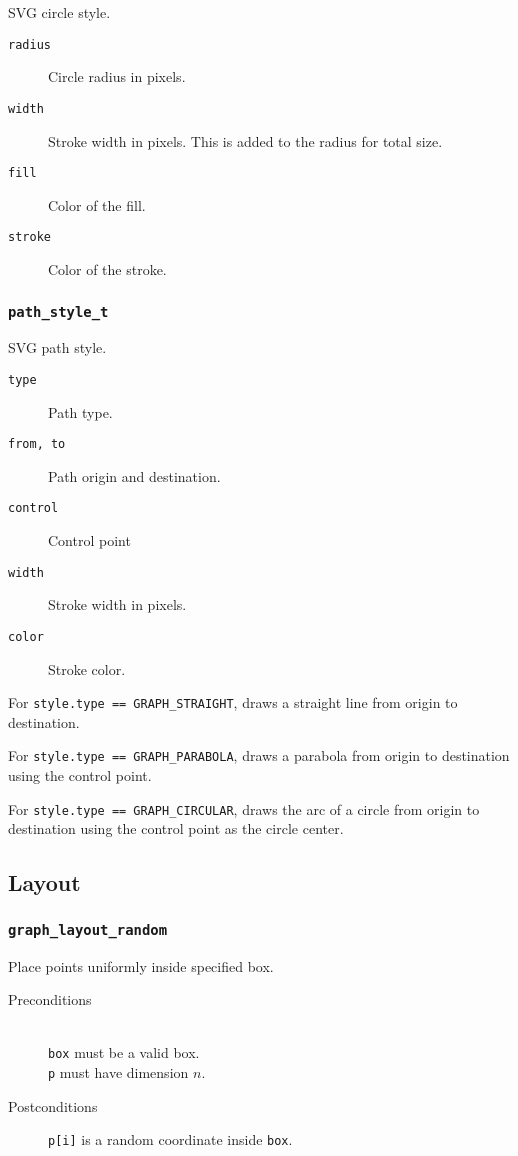 \documentclass[a4paper,10pt]{article}
\begin{document}
SVG circle style.

\begin{description}
 \item[\texttt{radius}] Circle radius in pixels.
 \item[\texttt{width}] Stroke width in pixels. This is added to the radius for total
 size.
 \item[\texttt{fill}] Color of the fill.
 \item[\texttt{stroke}] Color of the stroke.
\end{description}

\subsubsection{\texttt{path\_style\_t}}

SVG path style.

\begin{description}
 \item[\texttt{type}] Path type.
 \item[\texttt{from, to}] Path origin and destination.
 \item[\texttt{control}] Control point
 \item[\texttt{width}] Stroke width in pixels.
 \item[\texttt{color}] Stroke color.
\end{description}

 For \texttt{style.type == GRAPH\_STRAIGHT}, draws a straight line from origin
 to destination.
 
 For \texttt{style.type == GRAPH\_PARABOLA}, draws a parabola from origin
 to destination using the control point.
 
 For \texttt{style.type == GRAPH\_CIRCULAR}, draws the arc of a circle from 
 origin to destination using the control point as the circle center.

\subsection{Layout}

\subsubsection{\texttt{graph\_layout\_random}}

Place points uniformly inside specified box.

\begin{description}
 \item[Preconditions]~\\
   \texttt{box} must be a valid box.\\
   \texttt{p} must have dimension $n$.
 \item[Postconditions] \texttt{p[i]} is a random coordinate inside \texttt{box}.
\end{description}
\end{document}
